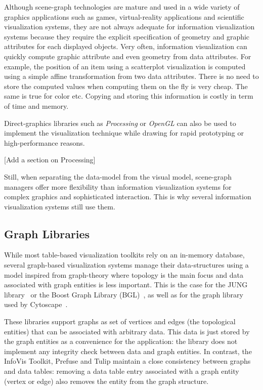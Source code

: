 Although scene-graph technologies are mature and used in a wide
variety of graphics applications such as games, virtual-reality
applications and scientific visualization systems, they are not always
adequate for information visualization systems because they require
the explicit specification of geometry and graphic attributes for each
displayed objects.  Very often, information visualization can quickly
compute graphic attribute and even geometry from data attributes.  For
example, the position of an item using a scatterplot visualization is
computed using a simple affine transformation from two data
attributes.  There is no need to store the computed values when
computing them on the fly is very cheap.  The same is true for color
etc.  Copying and storing this information is costly in term of time
and memory.

Direct-graphics libraries such as \emph{Processing} or \emph{OpenGL}
can also be used to implement the visualization technique while
drawing for rapid prototyping or high-performance reasons.

[Add a section on Processing]

Still, when separating the data-model from the visual model,
scene-graph managers offer more flexibility than information
visualization systems for complex graphics and sophisticated
interaction.  This is why several information visualization systems
still use them.


\subsection{Graph Libraries}

While most table-based visualization toolkits rely on an in-memory
database, several graph-based visualization systems manage their
data-structures using a model inspired from graph-theory where
topology is the main focus and data associated with graph entities is
less important.  This is the case for the JUNG library~\cite{jung2003}
or the Boost Graph Library (BGL)~\cite{BGL}, as well as for the graph
library used by Cytoscape~\cite{Cytoscape}.

These libraries support graphs as set of vertices and edges (the
topological entities) that can be associated with arbitrary data.
This data is just stored by the graph entities as a convenience for
the application: the library does not implement any integrity check
between data and graph entities.  In contrast, the InfoVis Toolkit,
Prefuse and Tulip maintain a close consistency between graphs and data
tables: removing a data table entry associated with a graph entity
(vertex or edge) also removes the entity from the graph structure.

